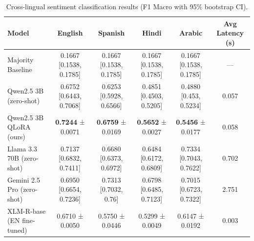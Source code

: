 \begin{table}[h]
\centering
\caption{Cross-lingual sentiment classification results (F1 Macro with 95\% bootstrap CI).}
\label{tab:results}
\begin{tabular}{lccccc}
\toprule
Model & English & Spanish & Hindi & Arabic & Avg Latency (s) \\
\midrule
Majority Baseline & 0.1667 [0.1538, 0.1785] & 0.1667 [0.1538, 0.1785] & 0.1667 [0.1538, 0.1785] & 0.1667 [0.1538, 0.1785] & — \\
Qwen2.5 3B (zero-shot) & 0.6752 [0.6443, 0.7068] & 0.6253 [0.5928, 0.6566] & 0.4851 [0.4503, 0.5205] & 0.4880 [0.453, 0.5234] & 0.057 \\
Qwen2.5 3B QLoRA (ours) & \textbf{0.7244} ± 0.0071 & \textbf{0.6759} ± 0.0169 & \textbf{0.5652} ± 0.0027 & \textbf{0.5456} ± 0.0177 & 0.058 \\
Llama 3.3 70B (zero-shot) & 0.7137 [0.6832, 0.7411] & 0.6680 [0.6373, 0.6972] & 0.6484 [0.6172, 0.6809] & 0.7334 [0.7043, 0.7622] & 0.702 \\
Gemini 2.5 Pro (zero-shot) & 0.6950 [0.6654, 0.7236] & 0.7313 [0.7032, 0.76] & 0.6798 [0.6485, 0.7123] & 0.7015 [0.6723, 0.7322] & 2.751 \\
XLM-R-base (EN fine-tuned) & 0.6710 ± 0.0050 & 0.5750 ± 0.0446 & 0.5299 ± 0.0049 & 0.6147 ± 0.0192 & 0.003 \\
\bottomrule
\end{tabular}
\end{table}
